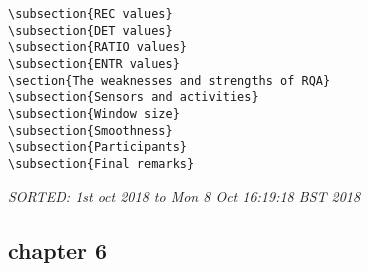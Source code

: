 \documentclass[10pt]{article}
\begin{document}
\begin{enumerate}
\begin{verbatim}
\subsection{REC values}
\subsection{DET values}
\subsection{RATIO values}
\subsection{ENTR values}
\section{The weaknesses and strengths of RQA}
\subsection{Sensors and activities}
\subsection{Window size}
\subsection{Smoothness}
\subsection{Participants}
\subsection{Final remarks}

\end{verbatim}
\textit{
SORTED:
1st oct 2018 to Mon  8 Oct 16:19:18 BST 2018
}
\\



\end{enumerate}







\subsection{chapter 6}
\end{document}
